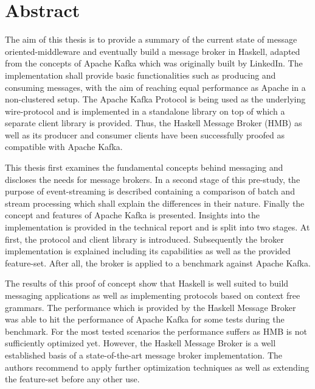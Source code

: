 \chapter{Abstract}

The aim of this thesis is to provide a summary of the current state of
message oriented-middleware and eventually build a message broker in
Haskell, adapted from the concepts of Apache Kafka which was originally
built by LinkedIn. The implementation shall provide basic
functionalities such as producing and consuming messages, with the aim
of reaching equal performance as Apache in a non-clustered setup. The
Apache Kafka Protocol is being used as the underlying wire-protocol and
is implemented in a standalone library on top of which a separate client
library is provided. Thus, the Haskell Message Broker (HMB) as well as
its producer and consumer clients have been successfully proofed as
compatible with Apache Kafka.

This thesis first examines the fundamental concepts behind messaging and
discloses the needs for message brokers.  In a second stage of this
pre-study, the purpose of event-streaming is described containing a
comparison of batch and stream processing which shall explain the
differences in their nature. Finally the concept and features of Apache
Kafka is presented.  Insights into the implementation is provided in the
technical report and is split into two stages.  At first, the protocol
and client library is introduced. Subsequently the broker implementation
is explained including its capabilities as well as the provided
feature-set. After all, the broker is applied to a benchmark against
Apache Kafka. 

The results of this proof of concept show that Haskell is well suited to
build messaging applications as well as implementing protocols based on
context free grammars. The performance which is provided by the Haskell
Message Broker was able to hit the performance of Apache Kafka for some
tests during the benchmark. For the most tested scenarios the
performance suffers as HMB is not sufficiently optimized yet. However,
the Haskell Message Broker is a well established basis of a
state-of-the-art message broker implementation. The authors recommend to
apply further optimization techniques as well as extending the
feature-set before any other use.
